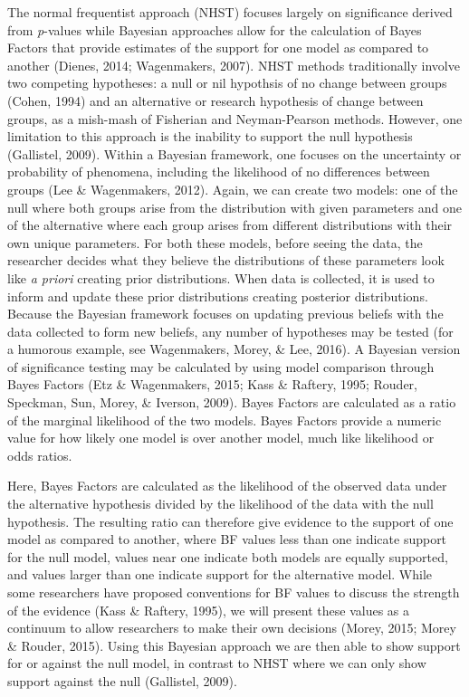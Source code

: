 \documentclass[english,man, mask]{apa6}
\theoremstyle{definition}
\theoremstyle{definition}
\theoremstyle{definition}
\theoremstyle{remark}
\begin{document}
The normal frequentist approach (NHST) focuses largely on significance
derived from \emph{p}-values while Bayesian approaches allow for the
calculation of Bayes Factors that provide estimates of the support for
one model as compared to another (Dienes, 2014; Wagenmakers, 2007). NHST
methods traditionally involve two competing hypotheses: a null or nil
hypothsis of no change between groups (Cohen, 1994) and an alternative
or research hypothesis of change between groups, as a mish-mash of
Fisherian and Neyman-Pearson methods. However, one limitation to this
approach is the inability to support the null hypothesis (Gallistel,
2009). Within a Bayesian framework, one focuses on the uncertainty or
probability of phenomena, including the likelihood of no differences
between groups (Lee \& Wagenmakers, 2012). Again, we can create two
models: one of the null where both groups arise from the distribution
with given parameters and one of the alternative where each group arises
from different distributions with their own unique parameters. For both
these models, before seeing the data, the researcher decides what they
believe the distributions of these parameters look like \emph{a priori}
creating prior distributions. When data is collected, it is used to
inform and update these prior distributions creating posterior
distributions. Because the Bayesian framework focuses on updating
previous beliefs with the data collected to form new beliefs, any number
of hypotheses may be tested (for a humorous example, see Wagenmakers,
Morey, \& Lee, 2016). A Bayesian version of significance testing may be
calculated by using model comparison through Bayes Factors (Etz \&
Wagenmakers, 2015; Kass \& Raftery, 1995; Rouder, Speckman, Sun, Morey,
\& Iverson, 2009). Bayes Factors are calculated as a ratio of the
marginal likelihood of the two models. Bayes Factors provide a numeric
value for how likely one model is over another model, much like
likelihood or odds ratios.

Here, Bayes Factors are calculated as the likelihood of the observed
data under the alternative hypothesis divided by the likelihood of the
data with the null hypothesis. The resulting ratio can therefore give
evidence to the support of one model as compared to another, where BF
values less than one indicate support for the null model, values near
one indicate both models are equally supported, and values larger than
one indicate support for the alternative model. While some researchers
have proposed conventions for BF values to discuss the strength of the
evidence (Kass \& Raftery, 1995), we will present these values as a
continuum to allow researchers to make their own decisions (Morey, 2015;
Morey \& Rouder, 2015). Using this Bayesian approach we are then able to
show support for or against the null model, in contrast to NHST where we
can only show support against the null (Gallistel, 2009).
\end{document}
